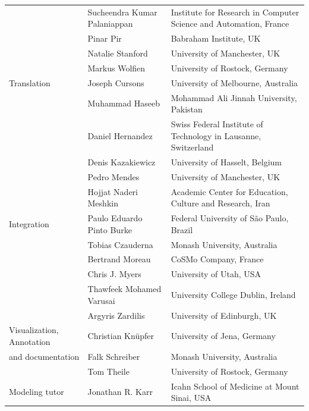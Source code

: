 \documentclass[journal,transmag]{IEEEtran}
\begin{document}
\begin{table}[ht!]
\begin{tabularx}{\textwidth}{l||l||X}
                       & Sucheendra Kumar Palaniappan     & Institute for Research in Computer Science and Automation, France\\
                       & Pinar Pir                        & Babraham Institute, UK\\
                       & Natalie Stanford                 & University of Manchester, UK\\
                       & Markus Wolfien                   & University of Rostock, Germany\\\hline
Translation            & Joseph Cursons                   & University of Melbourne, Australia\\
                       & Muhammad Haseeb                  & Mohammad Ali Jinnah University, Pakistan\\
                       & Daniel Hernandez                 & Swiss Federal Institute of Technology in Lausanne, Switzerland\\
                       & Denis Kazakiewicz                & University of Hasselt, Belgium\\
                       & Pedro Mendes                     & University of Manchester, UK\\
                       & Hojjat Naderi Meshkin            & Academic Center for Education, Culture and Research, Iran\\\hline
Integration            & Paulo Eduardo Pinto Burke        & Federal University of S\~ao Paulo, Brazil\\
                       & Tobias Czauderna                 & Monash University, Australia\\
                       & Bertrand Moreau                  & CoSMo Company, France\\
                       & Chris J. Myers                   & University of Utah, USA\\
		               & Thawfeek Mohamed Varusai         & University College Dublin, Ireland\\
		               & Argyris Zardilis                 & University of Edinburgh, UK\\\hline
Visualization, Annotation      & Christian Kn\"upfer              & University of Jena, Germany\\
and documentation          & Falk Schreiber                   & Monash University, Australia\\
                       & Tom Theile                       & University of Rostock, Germany\\\hline
Modeling tutor         & Jonathan R. Karr                 & Icahn School of Medicine at Mount Sinai, USA\\\hline
\end{tabularx}
\end{table}
\end{document}
